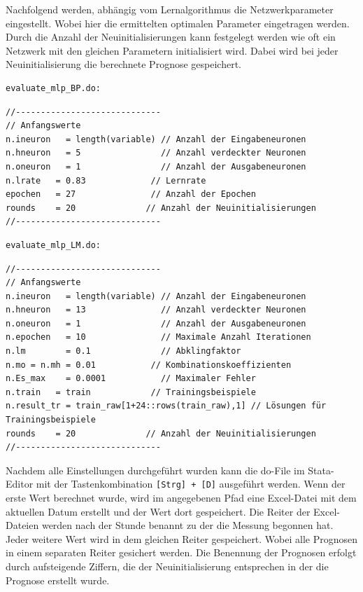 Nachfolgend werden, abhängig vom Lernalgorithmus die Netzwerkparameter eingestellt. Wobei hier die ermittelten optimalen Parameter eingetragen werden. Durch die Anzahl der Neuinitialisierungen kann festgelegt werden wie oft ein Netzwerk mit den gleichen Parametern initialisiert wird. Dabei wird bei jeder Neuinitialisierung die berechnete Prognose gespeichert.

\begin{Verbatim}
evaluate_mlp_BP.do:
\end{Verbatim}
{
\begin{lstlisting}[firstnumber=318]
//-----------------------------
// Anfangswerte
n.ineuron	= length(variable) // Anzahl der Eingabeneuronen
n.hneuron	= 5                // Anzahl verdeckter Neuronen
n.oneuron	= 1                // Anzahl der Ausgabeneuronen
n.lrate   = 0.83             // Lernrate
epochen   = 27               // Anzahl der Epochen
rounds    = 20			    // Anzahl der Neuinitialisierungen
//-----------------------------
\end{lstlisting}
}

\begin{Verbatim}
evaluate_mlp_LM.do:
\end{Verbatim}
{
\begin{lstlisting}[firstnumber=318]
//-----------------------------
// Anfangswerte
n.ineuron	= length(variable) // Anzahl der Eingabeneuronen
n.hneuron	= 13               // Anzahl verdeckter Neuronen
n.oneuron	= 1                // Anzahl der Ausgabeneuronen
n.epochen	= 10               // Maximale Anzahl Iterationen
n.lm		= 0.1              // Abklingfaktor
n.mo = n.mh = 0.01           // Kombinationskoeffizienten
n.Es_max	= 0.0001           // Maximaler Fehler
n.train   = train            // Trainingsbeispiele
n.result_tr = train_raw[1+24::rows(train_raw),1] // Lösungen für Trainingsbeispiele
rounds    = 20			    // Anzahl der Neuinitialisierungen
//-----------------------------
\end{lstlisting}
}

Nachdem alle Einstellungen durchgeführt wurden kann die do-File im Stata-Editor mit der Tastenkombination \verb|[Strg] + [D]| ausgeführt werden. Wenn der erste Wert berechnet wurde, wird im angegebenen Pfad eine Excel-Datei mit dem aktuellen Datum erstellt und der Wert dort gespeichert. Die Reiter der Excel-Dateien werden nach der Stunde benannt zu der die Messung begonnen hat. Jeder weitere Wert wird in dem gleichen Reiter gespeichert. Wobei alle Prognosen in einem separaten Reiter gesichert werden. Die Benennung der Prognosen erfolgt durch aufsteigende Ziffern, die der Neuinitialisierung entsprechen in der die Prognose erstellt wurde.
